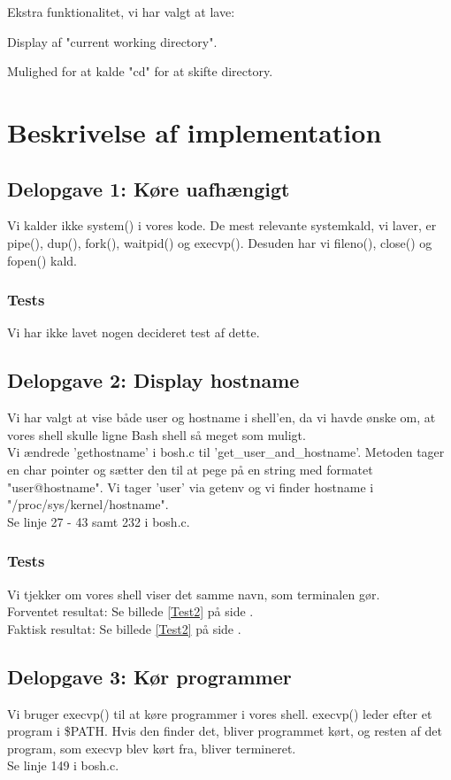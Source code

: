 Ekstra funktionalitet, vi har valgt at lave:
\begin{my_enumerate}
\item Display af "current working directory".
\item Mulighed for at kalde "cd" for at skifte directory.
\end{my_enumerate}

\section{Beskrivelse af implementation}
\subsection{Delopgave 1: Køre uafhængigt}
\label{D1}
Vi kalder ikke system() i vores kode. De mest relevante systemkald, vi laver, er pipe(), dup(), fork(), waitpid() og execvp(). Desuden har vi fileno(), close() og fopen() kald.
\subsubsection{Tests}
Vi har ikke lavet nogen decideret test af dette.

\subsection{Delopgave 2: Display hostname}
\label{D2}
Vi har valgt at vise både user og hostname i shell'en, da vi havde ønske om, at vores shell skulle ligne Bash shell så meget som muligt.
\\Vi ændrede 'gethostname' i bosh.c til 'get\_user\_and\_hostname'. Metoden tager en char pointer og sætter den til at pege på en string med formatet "user@hostname". Vi tager 'user' via getenv og vi finder hostname i "/proc/sys/kernel/hostname".
\\Se linje 27 - 43 samt 232 i bosh.c.
\subsubsection{Tests}
Vi tjekker om vores shell viser det samme navn, som terminalen gør.
\\Forventet resultat: Se billede \ref{Test2} på side \pageref{Test2}.
\\Faktisk resultat: Se billede \ref{Test2} på side \pageref{Test2}.

\subsection{Delopgave 3: Kør programmer}
\label{D3}
Vi bruger execvp() til at køre programmer i vores shell. execvp() leder efter et program i \$PATH. Hvis den finder det, bliver programmet kørt, og resten af det program, som execvp blev kørt fra, bliver termineret. 
\\Se linje 149 i bosh.c.
